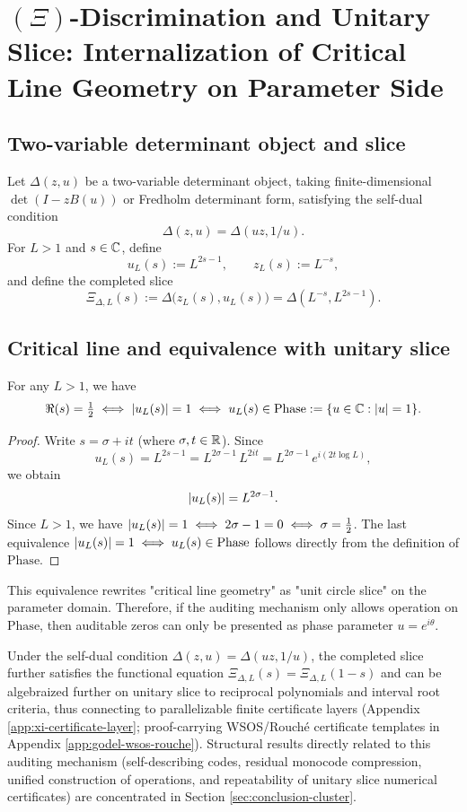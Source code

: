 \section{\texorpdfstring{$(\Xi)$}{(Xi)}-Discrimination and Unitary Slice: Internalization of Critical Line Geometry on Parameter Side}\label{sec:xi-unitary-slice}

\subsection{Two-variable determinant object and slice}
Let $\Delta(z,u)$ be a two-variable determinant object, taking finite-dimensional $\det(I-zB(u))$ or Fredholm determinant form, satisfying the self-dual condition
$$
\Delta(z,u)=\Delta(uz,1/u).
$$
For $L>1$ and $s\in\mathbb{C}$, define
$$
u_L(s):=L^{2s-1},\qquad z_L(s):=L^{-s},
$$
and define the completed slice
$$
\Xi_{\Delta,L}(s):=\Delta\bigl(z_L(s),u_L(s)\bigr)=\Delta(L^{-s},L^{2s-1}).
$$

\subsection{Critical line and equivalence with unitary slice}
\begin{proposition}\label{prop:critical-line-unitary-slice}
For any $L>1$, we have
$$
\Re(s)=\tfrac12 \iff \left\lvert u_L(s)\right\rvert=1 \iff u_L(s)\in \mathrm{Phase}:=\{u\in\mathbb{C}:\left\lvert u\right\rvert=1\}.
$$
\end{proposition}

\begin{proof}
Write $s=\sigma+it$ (where $\sigma,t\in\mathbb{R}$). Since
$$
u_L(s)=L^{2s-1}=L^{2\sigma-1}\,L^{2it}=L^{2\sigma-1}\,e^{i(2t\log L)},
$$
we obtain
$$
\left\lvert u_L(s)\right\rvert=L^{2\sigma-1}.
$$
Since $L>1$, we have $\left\lvert u_L(s)\right\rvert=1 \iff 2\sigma-1=0 \iff \sigma=\tfrac12$. The last equivalence $\left\lvert u_L(s)\right\rvert=1\iff u_L(s)\in\mathrm{Phase}$ follows directly from the definition of $\mathrm{Phase}$.\par
\end{proof}

This equivalence rewrites "critical line geometry" as "unit circle slice" on the parameter domain. Therefore, if the auditing mechanism only allows operation on $\mathrm{Phase}$, then auditable zeros can only be presented as phase parameter $u=e^{i\theta}$.\par

Under the self-dual condition $\Delta(z,u)=\Delta(uz,1/u)$, the completed slice further satisfies the functional equation $\Xi_{\Delta,L}(s)=\Xi_{\Delta,L}(1-s)$ and can be algebraized further on unitary slice to reciprocal polynomials and interval root criteria, thus connecting to parallelizable finite certificate layers (Appendix \ref{app:xi-certificate-layer}; proof-carrying WSOS/Rouché certificate templates in Appendix \ref{app:godel-wsos-rouche}). Structural results directly related to this auditing mechanism (self-describing codes, residual monocode compression, unified construction of operations, and repeatability of unitary slice numerical certificates) are concentrated in Section \ref{sec:conclusion-cluster}.\par


